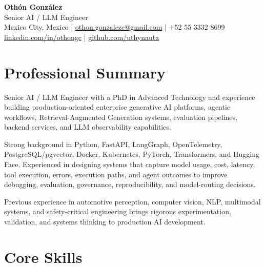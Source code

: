 \documentclass[10pt]{article}
\begin{document}

\begin{center}
    {\LARGE\textbf{Oth\'on Gonz\'alez}}\\[3pt]
    {\large Senior AI / LLM Engineer}\\[5pt]

    Mexico City, Mexico
    \enspace|\enspace
    \href{mailto:othon.gonzalezc@gmail.com}
    {othon.gonzalezc@gmail.com}
    \enspace|\enspace
    +52 55 3332 8699
    \\[2pt]
    \href{https://www.linkedin.com/in/thongc/}
    {linkedin.com/in/othongc}
    \enspace|\enspace
    \href{https://github.com/uthynauta}
    {github.com/uthynauta}
\end{center}


\section*{Professional Summary}

Senior AI / LLM Engineer with a PhD in Advanced Technology and experience
building production-oriented enterprise generative AI platforms, agentic
workflows, Retrieval-Augmented Generation systems, evaluation pipelines,
backend services, and LLM observability capabilities.

Strong background in Python, FastAPI, LangGraph, OpenTelemetry,
PostgreSQL/pgvector, Docker, Kubernetes, PyTorch, Transformers, and
Hugging Face. Experienced in designing systems that capture model usage,
cost, latency, tool execution, errors, execution paths, and agent outcomes
to improve debugging, evaluation, governance, reproducibility, and
model-routing decisions.

Previous experience in automotive perception, computer vision, NLP,
multimodal systems, and safety-critical engineering brings rigorous
experimentation, validation, and systems thinking to production AI
development.


\section*{Core Skills}
\end{document}
